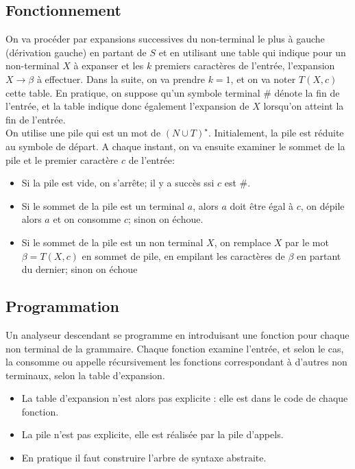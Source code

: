 \documentclass{cours}
\begin{document}
\subsection{Fonctionnement}
On va procéder par expansions successives du non-terminal le plus à gauche (dérivation gauche) en partant de $S$ et en utilisant une table qui indique pour un non-terminal $X$ à expanser et les $k$ premiers caractères de l'entrée, l'expansion $X\rightarrow\beta$ à effectuer. Dans la suite, on va prendre $k = 1$, et on va noter $T(X, c)$ cette table. En pratique, on suppose qu'un symbole terminal \# dénote la fin de l'entrée, et la table indique donc également l'expansion de $X$ lorsqu'on atteint la fin de l'entrée.\\
On utilise une pile qui est un mot de $\left(N \cup T\right)^{\star}$. Initialement, la pile est réduite au symbole de départ. A chaque instant, on va ensuite examiner le sommet de la pile et le premier caractère $c$ de l'entrée:
\begin{itemize}
    \item Si la pile est vide, on s'arrête; il y a succès ssi $c$ est \#.
    \item Si le sommet de la pile est un terminal $a$, alors $a$ doit être égal à $c$, on dépile alors $a$ et on consomme $c$; sinon on échoue.
    \item Si le sommet de la pile est un non terminal $X$, on remplace $X$ par le mot $\beta = T(X, c)$ en sommet de pile, en empilant les caractères de $\beta$ en partant du dernier; sinon on échoue
\end{itemize}

\subsection{Programmation}
Un analyseur descendant se programme en introduisant une fonction pour chaque non terminal de la grammaire. Chaque fonction examine l'entrée, et selon le cas, la consomme ou appelle récursivement les fonctions correspondant à d'autres non terminaux, selon la table d'expansion.
\begin{remark}
    \begin{itemize}
        \item La table d'expansion n'est alors pas explicite : elle est dans le code de chaque fonction.
        \item La pile n'est pas explicite, elle est réalisée par la pile d'appels.
        \item En pratique il faut construire l'arbre de syntaxe abstraite.
    \end{itemize}
\end{remark}
\end{document}
